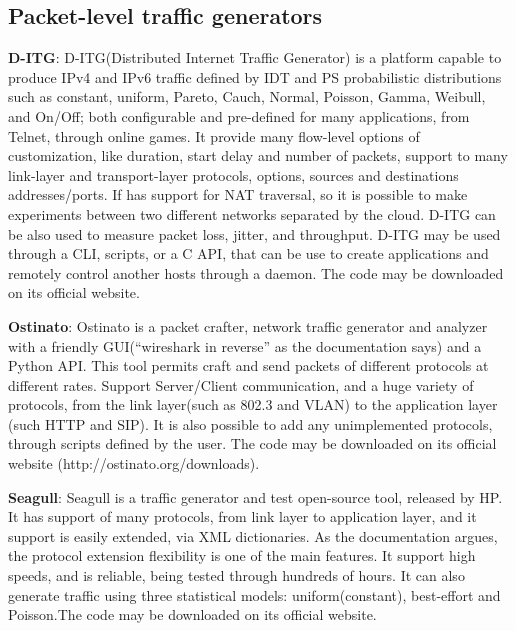 \subsection{Packet-level traffic generators}


\textbf{D-ITG}\cite{ditg-paper}\cite{web-ditg}: D-ITG(Distributed Internet Traffic Generator) is a platform capable to produce IPv4 and IPv6 traffic defined by IDT and PS probabilistic distributions such as constant, uniform, Pareto, Cauch, Normal, Poisson, Gamma, Weibull, and On/Off; both configurable and pre-defined for many applications, from Telnet, through online games. It provide many flow-level options of customization, like duration, start delay and number of packets, support to many link-layer and transport-layer protocols, options, sources and destinations addresses/ports. If has support for NAT traversal, so it is possible to make experiments between two different networks separated by the cloud. D-ITG can be also used to measure packet loss, jitter, and throughput. D-ITG may be used through a CLI, scripts, or a C API, that can be use to create applications and remotely control another hosts through a daemon. The code may be downloaded on its official website. 


\textbf{Ostinato}\cite{web-ostinato}: Ostinato is a packet crafter, network traffic generator and analyzer with a friendly GUI(“wireshark in reverse” as the documentation says) and a Python API. This tool permits craft and send packets of different protocols  at different rates. Support Server/Client communication, and a huge variety of protocols, from the link layer(such as 802.3 and VLAN) to the application layer (such HTTP and SIP). It is also possible to add any unimplemented protocols, through scripts defined by the user. The code may be downloaded on its official website (http://ostinato.org/downloads).


\textbf{Seagull}\cite{wp-seagull}\cite{web-seagull}: Seagull is a traffic generator and test open-source tool, released by HP. It has support of many protocols, from link layer to application layer, and it support is easily extended, via XML dictionaries. As the documentation argues, the protocol extension flexibility is one of the main features. It support high speeds, and is reliable, being tested through hundreds of hours. It can also generate traffic using three statistical models: uniform(constant), best-effort and Poisson.The code may be downloaded on its official website.


